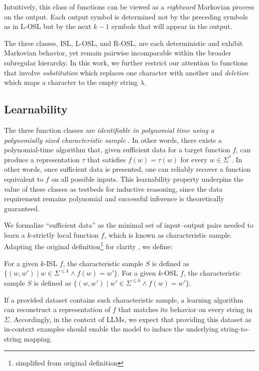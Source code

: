 Intuitively, this class of functions can be viewed as a \emph{rightward} Markovian process on the output. Each output symbol is determined not by the preceding symbols as in L-OSL but by the next $k-1$ symbols that will appear in the output.

The three classes, ISL, L-OSL, and R-OSL, are each deterministic and exhibit Markovian behavior, yet remain pairwise incomparable within the broader subregular hierarchy. In this work, we further restrict our attention to functions that involve \emph{substitution} which replaces one character with another and \emph{deletion} which maps a character to the empty string $\lambda$.

\subsection{Learnability}
The three function classes are \emph{identifiable in polynomial time using a polynomially sized characteristic sample} \citep{chandlee2014learning, chandlee2015output}. In other words, there exists a polynomial-time algorithm that, given sufficient data for a target function $f$, can produce a representation $\tau$ that satisfies $f(w) = \tau(w)$ for every $w\in\Sigma^*$. In other words, once sufficient data is presented, one can reliably recover a function equivalent to $f$ on all possible inputs. This learnability property underpins the value of these classes as testbeds for inductive reasoning, since the data requirement remains polynomial and successful inference is theoretically guaranteed.

We formalize ``sufficient data'' as the minimal set of input–output pairs needed to learn a $k$-strictly local function $f$, which is known as characteristic sample. Adapting the original definition\footnote{simplified from original definition} for clarity \citep{chandlee2014learning, chandlee2015output}, we define:
\begin{definition}
For a given $k$-ISL $f$, the characteristic sample $S$ is defined as $\{(w, w')\mid w\in \Sigma^{\leq k}\land f(w) = w'\}$. For a given $k$-OSL $f$, the characteristic sample $S$ is defined as $\{(w, w')\mid w'\in \Sigma^{\leq k}\land f(w) = w'\}$.
\end{definition}

If a provided dataset contains such characteristic sample, a learning algorithm can reconstruct a representation of $f$ that matches its behavior on every string in $\Sigma$. Accordingly, in the context of LLMs, we expect that providing this dataset as in-context examples should enable the model to induce the underlying string-to-string mapping. 

